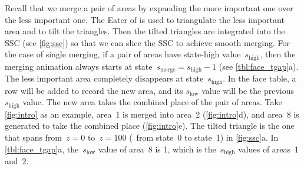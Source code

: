 \documentclass{ica}
\begin{document}
Recall that we merge a pair of areas by expanding 
the more important one over the less important one.
The Eater of \citet{Suba2014Merge} is used to 
triangulate the less important area and to tilt the triangles.
Then the tilted triangles are integrated into the SSC
(see \fig\ref{fig:ssc})
so that we can slice the SSC to achieve smooth merging.
For the case of single merging,
if a pair of areas have state-high value~$s_\mathrm{high}$,
then the merging animation 
always starts at state~$s_\mathrm{merge}=s_\mathrm{high}-1$
(see \tbl\ref{tbl:face_tgap}a).
The less important area completely disappears
at state~$s_\mathrm{high}$.
In the face table, a row will be added to record the new area, 
and its $s_\mathrm{low}$ value will be the previous~$s_\mathrm{high}$ value.
The new area takes the combined place of the pair of areas.
Take \fig\ref{fig:intro} as an example, 
area~1 is merged into area~2 (\figs\ref{fig:intro}d), 
and area~8 is generated to take the combined place (\figs\ref{fig:intro}e).
The tilted triangle is the one that spans 
from~$z= 0$ to~$z=100$ (\ie~from state~0 to state~1)
in \fig\ref{fig:ssc}a.
In \tbl\ref{tbl:face_tgap}a, 
the~$s_\mathrm{low}$ value of area~8 is 1,
which is the~$s_\mathrm{high}$ values of areas~1 and~2.
\end{document}
